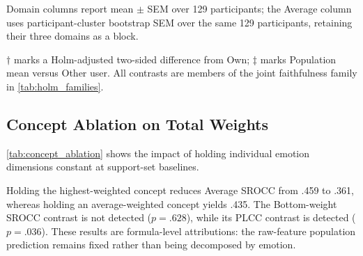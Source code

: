 \documentclass[10pt,twocolumn,letterpaper]{article}
\begin{document}
\begin{table}[!tbp]
\begin{threeparttable}
\begin{tabular}{ll cc cc cc cc}
        \bottomrule
    \end{tabular}
\begin{tablenotes}[flushleft]\footnotesize
    \item Domain columns report mean $\pm$ SEM over 129 participants; the Average
    column uses participant-cluster bootstrap SEM over the same 129 participants,
    retaining their three domains as a block.
    \item $\dagger$ marks a Holm-adjusted two-sided difference from Own;
    $\ddagger$ marks Population mean versus Other user. All contrasts are members
    of the joint faithfulness family in \cref{tab:holm_families}.
\end{tablenotes}
\end{threeparttable}
\end{table}


\subsection{Concept Ablation on Total Weights}
\cref{tab:concept_ablation} shows the impact of holding individual emotion dimensions constant at support-set baselines.

Holding the highest-weighted concept reduces Average SROCC from .459 to .361,
whereas holding an average-weighted concept yields .435. The Bottom-weight
SROCC contrast is not detected ($p=.628$), while its PLCC contrast is detected
($p=.036$). These results are formula-level attributions: the raw-feature
population prediction remains fixed rather than being decomposed by emotion.
\end{document}
